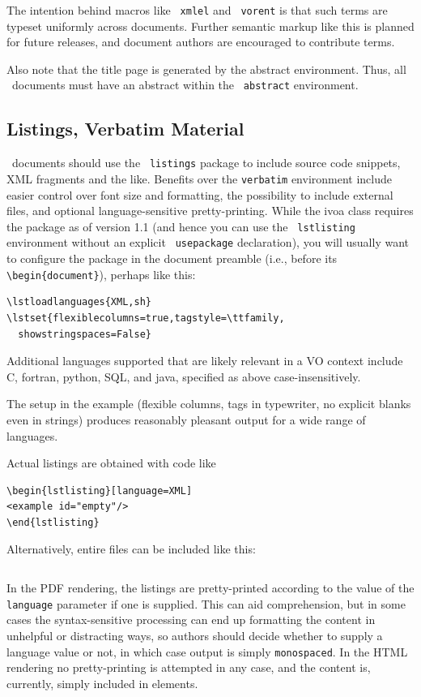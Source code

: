 \documentclass[11pt,a4paper]{ivoa}
\newcommand{\texword}[1]{\texttt{\color{texcolor} #1}}
\begin{document}
The intention behind macros like \texword{xmlel} and \texword{vorent} is
that such terms are typeset uniformly across documents.  Further
semantic markup like this is planned for future releases, and document
authors are encouraged to contribute terms.

Also note that the title page is generated by the abstract environment.
Thus, all \ivoatex\ documents must have an abstract within the
\texword{abstract} environment.

\subsection{Listings, Verbatim Material}
\label{sect:verbatim}

\ivoatex\ documents should use the \texword{listings} package to include
source code snippets, XML fragments and the like.
Benefits over the \verb|verbatim| environment include easier control over
font size and formatting, the possibility to include external files,
and optional language-sensitive pretty-printing.
While the ivoa class
requires the package as of version 1.1 (and hence you can use the
\texword{lstlisting} environment without an explicit
\texword{usepackage} declaration), you will usually want to configure
the package in the document preamble (i.e., before its
\verb|\begin{document}|), perhaps like this:

\begin{lstlisting}
\lstloadlanguages{XML,sh}
\lstset{flexiblecolumns=true,tagstyle=\ttfamily,
  showstringspaces=False}
\end{lstlisting}

Additional
languages supported that are likely relevant in a VO context include C,
fortran, python, SQL, and java, specified as above case-insensitively.

The setup in the example (flexible columns, tags in
typewriter, no explicit blanks even in strings)
produces reasonably pleasant output for a wide range of languages.

Actual listings are obtained with code like
\begin{verbatim}
\begin{lstlisting}[language=XML]
<example id="empty"/>
\end{lstlisting}
\end{verbatim}
Alternatively, entire files can be included like this:
\begin{verbatim}

\end{verbatim}
In the PDF rendering, the listings are pretty-printed
according to the value of the \verb|language| parameter if one is supplied.
This can aid comprehension, but in some cases the syntax-sensitive
processing can end up formatting the content in
unhelpful or distracting ways,
so authors should decide whether to supply a language value
or not, in which case output is simply \verb|monospaced|.
In the HTML rendering no pretty-printing is attempted in any case,
and the content is, currently, simply included in  elements.
\end{document}
